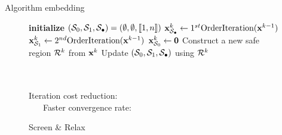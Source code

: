 \begin{frame}{Algorithm embedding}
    \begin{figure}[!h]
        \centering
        \begin{minipage}{0.8\linewidth}
            \begin{algorithm}[H]
                \label{algo:screen-and-relax}
                \caption{Screen \& Relax}
                \begin{algorithmic}[1]
                    \State \textbf{initialize} $(\mathcal{S}_0,\mathcal{S}_1,\mathcal{S}_\bullet)=(\emptyset,\emptyset,\llbracket1,n\rrbracket)$
                    \Repeat
                        \State \texttt{}
                        \State 
                        $\mathbf{x}_{\mathcal{S}_\bullet}^{k} \gets 1^{st}\text{OrderIteration}(\mathbf{x}^{k-1})$
                        \State 
                        $\mathbf{x}_{\mathcal{S}_1}^{k} \gets 2^{nd}\text{OrderIteration}(\mathbf{x}^{k-1})$
                        \State 
                        $\mathbf{x}_{\mathcal{S}_0}^{k} \gets {\mathbf 0}$
                        \State \texttt{}
                        \State Construct a new safe region $\mathcal{R}^k$ from $\mathbf{x}^{k}$
                        \State Update $(\mathcal{S}_0,\mathcal{S}_1,\mathcal{S}_\bullet)$ using $\mathcal{R}^k$
                \end{algorithmic}
            \end{algorithm} 
        \end{minipage}
        ~\\~\\
        Iteration cost reduction: 
        ~\\
        $\quad \ \, $ Faster convergence rate: 
    \end{figure}
\end{frame}
